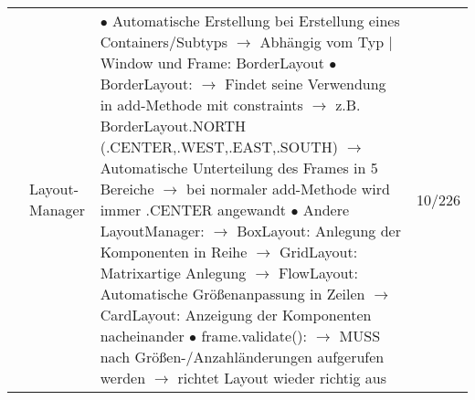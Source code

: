 \documentclass[11pt,a4paper]{article}
\begin{document}
\begin{center}
\begin{longtable}[h]{ | p{2.3cm} | p{2.3cm} | p{12.6cm} | p{1.2cm} | }
	& Layout-Manager & \makecell[l]{$\bullet$ Automatische Erstellung bei Erstellung eines Containers/Subtyps \\
	\hspace{0.4cm} $\rightarrow$ Abhängig vom Typ | Window und Frame: BorderLayout \\
	$\bullet$ BorderLayout: \\
	\hspace{0.4cm} $\rightarrow$ Findet seine Verwendung in add-Methode mit constraints \\
	\hspace{0.4cm} $\rightarrow$ z.B. BorderLayout.NORTH (.CENTER,.WEST,.EAST,.SOUTH) \\
	\hspace{0.4cm} $\rightarrow$ Automatische Unterteilung des Frames in 5 Bereiche \\
	\hspace{0.4cm} $\rightarrow$ bei normaler add-Methode wird immer .CENTER angewandt \\
	$\bullet$ Andere LayoutManager: \\
	\hspace{0.4cm} $\rightarrow$ BoxLayout: Anlegung der Komponenten in Reihe \\
	\hspace{0.4cm} $\rightarrow$ GridLayout: Matrixartige Anlegung \\
	\hspace{0.4cm} $\rightarrow$ FlowLayout: Automatische Größenanpassung in Zeilen \\
	\hspace{0.4cm} $\rightarrow$ CardLayout: Anzeigung der Komponenten nacheinander \\
	$\bullet$ frame.validate(): \\
	\hspace{0.4cm} $\rightarrow$ MUSS nach Größen-/Anzahländerungen aufgerufen werden \\ 
	\hspace{0.4cm} $\rightarrow$ richtet Layout wieder richtig aus}	 & 10/226 \\ \cline{2-4}
	

\end{longtable}
\end{center}
\end{document}
